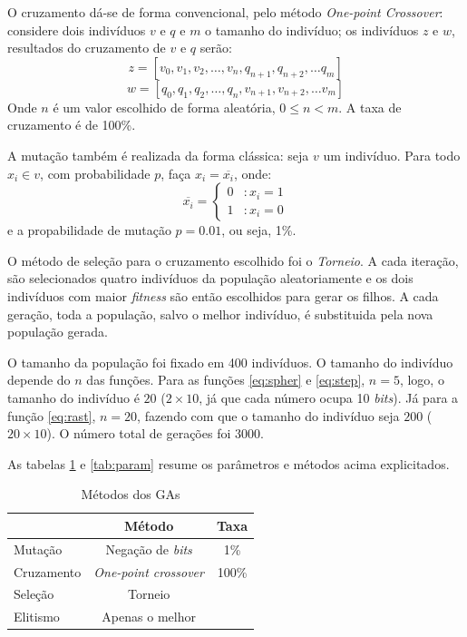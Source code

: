 \documentclass[12pt]{article}
\begin{document}
O cruzamento dá-se de forma convencional, pelo método \emph{One-point Crossover}: considere dois indivíduos $v$ e $q$ e $m$ o tamanho do indivíduo; os indivíduos $z$ e $w$, resultados do cruzamento de $v$ e $q$ serão:
\[
  z = [v_0, v_1, v_2, \dots, v_n, q_{n+1}, q_{n+2}, \dots q_m]
\]
\[
   w = [q_0, q_1, q_2, \dots, q_n, v_{n+1}, v_{n+2}, \dots v_m]
\]
Onde $n$ é um valor escolhido de forma aleatória, $ 0 \le n < m$.
A taxa de cruzamento é de 100\%.

A mutação também é realizada da forma clássica: seja $v$ um indivíduo. Para todo $x_i \in v$, com probabilidade $p$, faça $x_i = \overline{x_i}$, onde:
 \begin{displaymath}
   \overline{x_i} = \left\{
     \begin{array}{lr}
       0 & : x_i = 1 \\
       1 & : x_i = 0
     \end{array}
   \right.
\end{displaymath} 
e a propabilidade de mutação $p = 0.01$, ou seja, 1\%. 

O método de seleção para o cruzamento escolhido foi o \emph{Torneio}. A cada iteração, são selecionados quatro indivíduos da população aleatoriamente e os dois indivíduos com maior \emph{fitness} são então escolhidos para gerar os filhos. A cada geração, toda a população, salvo o melhor indivíduo, é substituida pela nova população gerada.

O tamanho da população foi fixado em 400 indivíduos. O tamanho do indivíduo depende do $n$ das funções. Para as funções \ref{eq:spher} e \ref{eq:step}, $n = 5$, logo, o tamanho do indivíduo é $20$ ($2 \times 10$, já que cada número ocupa 10 \emph{bits}). Já para a função \ref{eq:rast}, $n = 20$, fazendo com que o tamanho do indivíduo seja $200$ ($20 \times 10$). O número total de gerações foi $3000$.


As tabelas \ref{tab:met} e \ref{tab:param} resume os parâmetros e métodos acima explicitados.

\begin{table} 
  \centering
  \begin{tabular}{l|c|c|}
    \cline{2-3} 
    & \textbf{Método} & \textbf{Taxa}\\ \hline
    \multicolumn{1}{|l|}{Mutação} & Negação de \emph{bits} & 1\% \\ \hline
    \multicolumn{1}{|l|}{Cruzamento} & \emph{One-point crossover} & 100\%  \\ \hline
    \multicolumn{1}{|l|}{Seleção} & Torneio  \\ \cline{0-1}
    \multicolumn{1}{|l|}{Elitismo} & Apenas o melhor \\ \cline{0-1}
  \end{tabular}
  \caption{Métodos dos GAs}
  \label{tab:met}
\end{table}
\end{document}
